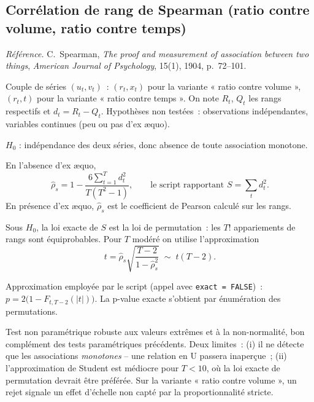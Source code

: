 \documentclass[a4paper,11pt]{article}
\newcommand{\code}[1]{\texttt{\small #1}}
\newcommand{\refl}[1]{{\small\textcolor{maincolor!70!black}{\textit{Référence.} #1}}\par\smallskip}
\newcounter{ficheid}
\newenvironment{fiche}[1]{%
  \stepcounter{ficheid}%
  \phantomsection
  \subsection{#1}%
  \label{fiche:\theficheid}%
}{%
  \end{description}\vspace{0.5em}%
}
\newcommand{\Cadre}{%
  \begin{description}[leftmargin=0pt, style=unboxed, itemsep=3pt, topsep=3pt, parsep=2pt]%
  \item[\textcolor{financeblue}{\textbf{1. Cadre, notations et hypothèses de validité (non testées).}}]}
\newcommand{\Hzero}{\item[\textcolor{financeblue}{\textbf{2. Hypothèse nulle.}}]}
\newcommand{\Stat}{\item[\textcolor{financeblue}{\textbf{3. Statistique de test.}}]}
\newcommand{\Loi}{\item[\textcolor{financeblue}{\textbf{4. Loi sous $H_0$.}}]}
\newcommand{\Pval}{\item[\textcolor{financeblue}{\textbf{5. p-value.}}]}
\newcommand{\Usage}{\item[\textcolor{financeblue}{\textbf{6. Usage et limites.}}]}
\begin{document}
\begin{fiche}{Corrélation de rang de Spearman (ratio contre volume, ratio contre temps)}
\refl{C.~Spearman, \emph{The proof and measurement of association between two things},
\emph{American Journal of Psychology}, 15(1), 1904, p.~72--101.}
\Cadre
Couple de séries $(u_t, v_t)$~: $(r_t, x_t)$ pour la variante « ratio contre volume »,
$(r_t, t)$ pour la variante « ratio contre temps ». On note $R_t$, $Q_t$ les rangs respectifs et
$d_t = R_t - Q_t$. Hypothèses non testées~: observations indépendantes, variables continues (peu
ou pas d'ex \ae quo).
\Hzero
$H_0$ : indépendance des deux séries, donc absence de toute association monotone.
\Stat
En l'absence d'ex \ae quo,
\[
  \hat\rho_s = 1 - \frac{6\sum_{t=1}^{T} d_t^2}{T(T^2-1)} ,
  \qquad\text{le script rapportant } S = \sum_t d_t^2 .
\]
En présence d'ex \ae quo, $\hat\rho_s$ est le coefficient de Pearson calculé sur les rangs.
\Loi
Sous $H_0$, la loi exacte de $S$ est la loi de permutation~: les $T!$ appariements de rangs sont
équiprobables. Pour $T$ modéré on utilise l'approximation
\[
  t = \hat\rho_s\sqrt{\frac{T-2}{1-\hat\rho_s^2}} \;\sim\; t(T-2).
\]
\Pval
Approximation employée par le script (appel avec \code{exact = FALSE})~:
$p = 2\big(1 - F_{t,T-2}(|t|)\big)$. La p-value exacte s'obtient par énumération des permutations.
\Usage
Test non paramétrique robuste aux valeurs extrêmes et à la non-normalité, bon complément des
tests paramétriques précédents. Deux limites~: (i) il ne détecte que les associations
\emph{monotones} -- une relation en U passera inaperçue~; (ii) l'approximation de Student est
médiocre pour $T < 10$, où la loi exacte de permutation devrait être préférée. Sur la variante
« ratio contre volume », un rejet signale un effet d'échelle non capté par la proportionnalité
stricte.
\end{fiche}
\end{document}
